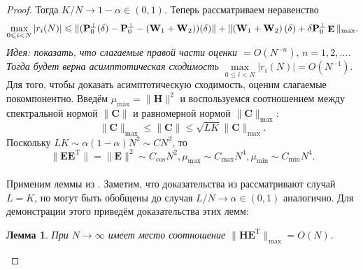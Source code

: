 \documentclass[specialist,
substylefile = spbu_report.rtx,
subf,href,colorlinks=true, 12pt]{disser}
\let\H\relax
\DeclareMathOperator\H{\mathbf{H}}
\DeclareMathOperator\E{\mathbf{E}}
\newtheorem{lemma}{Лемма}
\begin{document}
	\begin{proof}
		Тогда $K/N \rightarrow 1 - \alpha \in (0,1)$. 
		Теперь рассматриваем неравенство
		\begin{equation*}
			\max_{0\leqslant i<N} |r_i(N)|\leqslant \|(\mathbf{P}_0^\bot(\delta)- \mathbf{P}_0^\bot-(\mathbf{W}_1+\mathbf{W}_2))\H(\delta)\| + \| (\mathbf{W}_1+\mathbf{W}_2)\, \H(\delta) + \delta \mathbf{P}_0^\perp \E\|_{\max}.
		\end{equation*}
		\emph{Идея: показать, что слагаемые правой части оценки $= O(N^{-n}),\,n=1,2,\dots$. Тогда будет верна асимптотическая сходимость $\max\limits_{0\leqslant i < N}|r_i(N)|=O(N^{-1})$}.
		\\
		Для того, чтобы доказать асимптотическую сходимость, оценим слагаемые покомпонентно. Введём $\mu_{\max} = \|\mathbf{H}\|^2$ и воспользуемся соотношением между спектральной нормой $\|\mathbf{C}\|$ и равномерной нормой $\|\mathbf{C}\|_{\max}$:
		\begin{equation*}
			\|\mathbf{C}\|_{\max} \leqslant\|\mathbf{C} \|\leqslant \sqrt{LK}\|\mathbf{C}\|_{\max}.
		\end{equation*}
		Поскольку $LK\sim \alpha(1-\alpha)N^2\sim CN^2$, то \begin{equation}
			\|\mathbf{EE}^\mathrm{T}\| = \|\mathbf{E}\|^2\sim C_{\cos}N^2, \mu_{\max} \sim C_{\max}N^4, \mu_{\min} \sim C_{\min}N^4.\label{eq:asymp_1}
		\end{equation}
		\\Применим леммы из \cite{ZNekrutkin}. Заметим, что доказательства из \cite{ZNekrutkin}  рассматривают случай $L=K$, но могут быть обобщены до случая $L/N\rightarrow\alpha\in(0,1)$ аналогично. Для демонстрации этого приведём доказательства этих лемм:
		\begin{lemma}\label{lem:2}
			При $N\rightarrow\infty$ имеет место соотношение $\|\mathbf{HE}^\mathrm{T}\|_{\max} = O(N)$.
		\end{lemma}
		

\end{proof}
\end{document}
